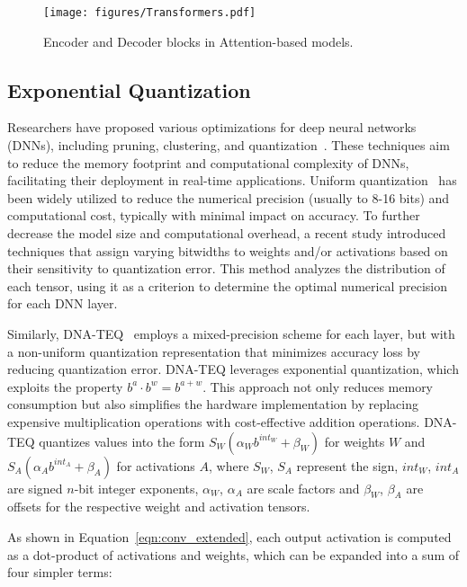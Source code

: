 \begin{figure}[t!]
\centering
\texttt{[image: figures/Transformers.pdf]}
\caption{Encoder and Decoder blocks in Attention-based models.}
\label{fig:Transformers}
\vskip -0.15in
\end{figure}
\vspace{-2.5mm}

\subsection{Exponential Quantization}\label{Exponential_quant}
Researchers have proposed various optimizations for deep neural networks (DNNs), including pruning, clustering, and quantization~\cite{permdnn}. These techniques aim to reduce the memory footprint and computational complexity of DNNs, facilitating their deployment in real-time applications. Uniform quantization~\cite{ReDY} has been widely utilized to reduce the numerical precision (usually to 8-16 bits) and computational cost, typically with minimal impact on accuracy. To further decrease the model size and computational overhead, a recent study \cite{mokey} introduced techniques that assign varying bitwidths to weights and/or activations based on their sensitivity to quantization error. This method analyzes the distribution of each tensor, using it as a criterion to determine the optimal numerical precision for each DNN layer.

Similarly, DNA-TEQ~\cite{DNA-TEQ} employs a mixed-precision scheme for each layer, but with a non-uniform quantization representation that minimizes accuracy loss by reducing quantization error. DNA-TEQ leverages exponential quantization, which exploits the property $b^{a} \cdot b^{w} = b^{a + w}$. This approach not only reduces memory consumption but also simplifies the hardware implementation by replacing expensive multiplication operations with cost-effective addition operations. DNA-TEQ quantizes values into the form $S_{W}(\alpha_{W} b^{int_{W}} + \beta_{W})$ for weights $W$ and $S_{A}(\alpha_{A} b^{int_{A}} + \beta_{A})$ for activations $A$, where $S_{W}$, $S_{A}$ represent the sign, $int_{W}$, $int_{A}$ are signed $n$-bit integer exponents, $\alpha_{W}$, $\alpha_{A}$ are scale factors and $\beta_{W}$, $\beta_{A}$ are offsets for the respective weight and activation tensors.

As shown in Equation~\ref{eqn:conv_extended}, each output activation is computed as a dot-product of activations and weights, which can be expanded into a sum of four simpler terms:


